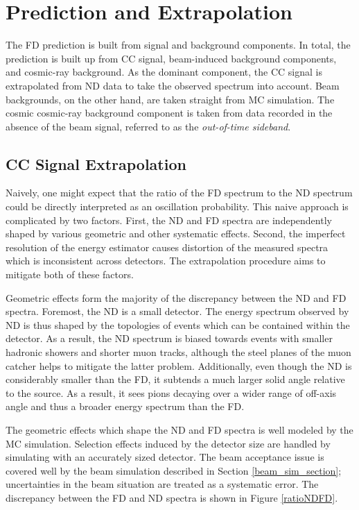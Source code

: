 \section{Prediction and Extrapolation}
\label{extrap_section}

The FD prediction is built from signal and background components.
In total, the prediction is built up from \numu CC signal, beam-induced
background components, and cosmic-ray background.
As the dominant component, the \numu CC signal is extrapolated from
ND data to take the observed spectrum into account.
Beam backgrounds, on the other hand, are taken straight from MC simulation.
The cosmic cosmic-ray background component is taken from data recorded
in the absence of the \numi beam signal, referred to as the
\textit{out-of-time sideband}.

\subsection{\numu CC Signal Extrapolation}
\label{sig_extrap_section}
Naively, one might expect that the ratio of the FD spectrum to the ND spectrum
could be directly interpreted as an oscillation probability.
This naive approach is complicated by two factors.
First, the ND and FD spectra are independently shaped by various geometric
and other systematic effects.
Second, the imperfect resolution of the energy estimator causes
distortion of the measured spectra which is inconsistent across detectors.
The extrapolation procedure aims to mitigate both of these factors.

Geometric effects form the majority of the discrepancy between the
ND and FD spectra.
Foremost, the ND is a small detector.
The energy spectrum observed by ND is thus shaped by the topologies
of events which can be contained within the detector.
As a result, the ND spectrum is biased towards events with
smaller hadronic showers and shorter muon tracks, although the steel planes
of the muon catcher helps to mitigate the latter problem.
Additionally, even though the ND is considerably smaller than the FD,
it subtends a much larger solid angle relative to the \numi source.
As a result, it sees pions decaying over a wider range of off-axis angle
and thus a broader energy spectrum than the FD.


The geometric effects which shape the ND and FD spectra is well modeled
by the MC simulation.
Selection effects induced by the detector size are handled by simulating
with an accurately sized detector.
The beam acceptance issue is covered well by the beam simulation described in
Section \ref{beam_sim_section}; uncertainties in the beam situation are
treated as a systematic error.
The discrepancy between the FD and ND spectra is shown in Figure
\ref{ratioNDFD}.


